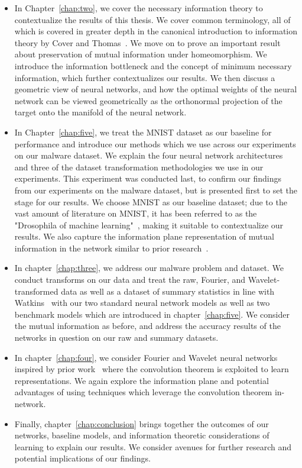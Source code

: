 \begin{itemize}
	\item In Chapter~\ref{chap:two}, we cover the necessary information theory to contextualize the results of this thesis. We cover common terminology, all of which is covered in greater depth in the canonical introduction to information theory by Cover and Thomas~\cite{coverthomas2006}. We move on to prove an important result about preservation of mutual information under homeomorphism. We introduce the information bottleneck and the concept of minimum necessary information,  which further contextualizes our results. We then discuss a geometric view of neural networks, and how the optimal weights of the neural network can be viewed geometrically as the orthonormal projection of the target onto the manifold of the neural network.
	\item In Chapter~\ref{chap:five}, we treat the MNIST dataset as our baseline for performance and introduce our methods which we use across our experiments on our malware dataset. We explain the four neural network architectures and three of the dataset transformation methodologies we use in our experiments. This experiment was conducted last, to confirm our findings from our experiments on the malware dataset, but is presented first to set the stage for our results. We choose MNIST as our baseline dataset; due to the vast amount of literature on MNIST, it has been referred to as the "Drosophila of machine learning"~\cite{goodfellow2016deep}, making it suitable to contextualize our results. We also capture the information plane representation of mutual information in the network similar to prior research~\cite{shwartz2017opening, saxe2019information}.
	\item In chapter~\ref{chap:three}, we address our malware problem and dataset. We conduct transforms on our data and treat the raw, Fourier, and Wavelet-transformed data as well as a dataset of summary statistics in line with Watkins~\cite{watkins2013using} with our two standard neural network models as well as two benchmark models which are introduced in chapter~\ref{chap:five}. We consider the mutual information as before, and address the accuracy results of the networks in question on our raw and summary datasets.
	\item In chapter~\ref{chap:four}, we consider Fourier and Wavelet neural networks inspired by prior work~\cite{pratt2017fcnn, fujieda2017wavelet} where the convolution theorem is exploited to learn representations. We again explore the information plane and potential advantages of using techniques which leverage the convolution theorem in-network.
	\item Finally, chapter~\ref{chap:conclusion} brings together the outcomes of our networks, baseline models, and information theoretic considerations of learning to explain our results. We consider avenues for further research and potential implications of our findings.
\end{itemize}
